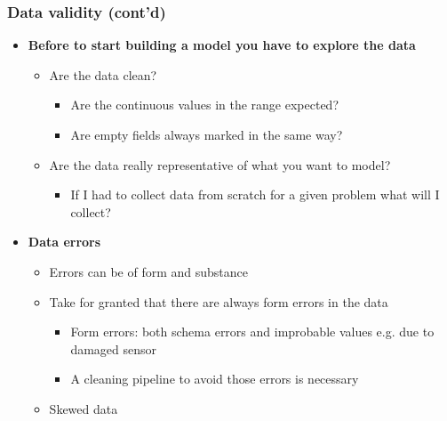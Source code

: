\documentclass{beamer}
\begin{document}
\begin{frame}\frametitle{Data validity (cont'd)}
\begin{itemize}
	\setlength\itemsep{1em}
	\item {\bf Before to start building a model you have to explore the data}
	\begin{itemize}
		\item Are the data clean?
		\begin{itemize}
			\item Are the continuous values in the range expected?
			\item Are empty fields always marked in the same way?
		\end{itemize}
		\item Are the data really representative of what you want to model?
		\begin{itemize}
			\item If I had to collect data from scratch for a given problem what will I collect?
		\end{itemize}
	\end{itemize}
	\item {\bf Data errors}
	\begin{itemize}
		\item Errors can be of form and substance
		\item Take for granted that there are always form errors in the data
		\begin{itemize}
			\item Form errors: both schema errors and improbable values e.g. due to damaged sensor 
			\item A cleaning pipeline to avoid those errors is necessary
		\end{itemize}
		\item Skewed data
	\end{itemize}
\end{itemize}
\end{frame}
\end{document}
